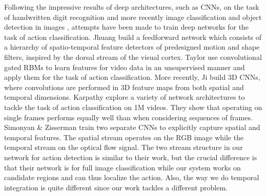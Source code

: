 \documentclass[10pt,twocolumn,letterpaper]{article}
\begin{document}
Following the impressive results of deep architectures, such as CNNs, on the task of handwritten digit recognition \cite{lecun-89e} and more recently image classification \cite{krizhevsky2012imagenet} and object detection in images \cite{girshick2014rcnn}, attempts have been made to train deep networks for the task of action classification. Jhuang \etal \cite{Jhuang2007} build a feedforward network which consists of a hierarchy of spatio-temporal feature detectors of predesigned motion and shape filters, inspired by the dorsal stream of the visual cortex. Taylor \etal \cite{taylor2010} use convolutional gated RBMs to learn features for video data in an unsupervised manner and apply them for the task of action classification. More recently, Ji \etal \cite{3Dconv} build 3D CNNs, where convolutions are performed in 3D feature maps from both spatial and temporal dimensions. Karpathy \etal \cite{karpathy2014} explore a variety of network architectures to tackle the task of action classification on 1M videos. They show that operating on single frames performs equally well than when considering sequences of frames. Simonyan \& Zisserman \cite{simonyan2014} train two separate CNNs to explicitly capture spatial and temporal features. The spatial stream operates on the RGB image while the temporal stream on the optical flow signal. The two stream structure in our network for action detection is similar to their work, but the crucial difference is that their network is for full image classification while our system works on candidate regions and can thus localize the action. Also, the way we do temporal integration is quite different since our work tackles a different problem.
\end{document}
